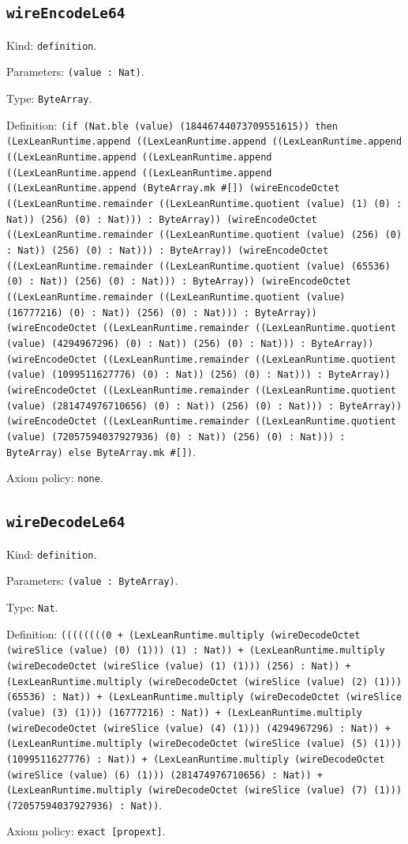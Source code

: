 \documentclass[11pt]{article}
\begin{document}
\subsection*{\texttt{wireEncodeLe64}}
\noindent Kind: \texttt{definition}.\par
\noindent Parameters: \texttt{(value : Nat)}.\par
\noindent Type: \texttt{ByteArray}.\par
\noindent Definition: \texttt{(if (Nat.ble (value) (18446744073709551615)) then (LexLeanRuntime.append ((LexLeanRuntime.append ((LexLeanRuntime.append ((LexLeanRuntime.append ((LexLeanRuntime.append ((LexLeanRuntime.append ((LexLeanRuntime.append ((LexLeanRuntime.append (ByteArray.mk \#[]) (wireEncodeOctet ((LexLeanRuntime.remainder ((LexLeanRuntime.quotient (value) (1) (0) : Nat)) (256) (0) : Nat))) : ByteArray)) (wireEncodeOctet ((LexLeanRuntime.remainder ((LexLeanRuntime.quotient (value) (256) (0) : Nat)) (256) (0) : Nat))) : ByteArray)) (wireEncodeOctet ((LexLeanRuntime.remainder ((LexLeanRuntime.quotient (value) (65536) (0) : Nat)) (256) (0) : Nat))) : ByteArray)) (wireEncodeOctet ((LexLeanRuntime.remainder ((LexLeanRuntime.quotient (value) (16777216) (0) : Nat)) (256) (0) : Nat))) : ByteArray)) (wireEncodeOctet ((LexLeanRuntime.remainder ((LexLeanRuntime.quotient (value) (4294967296) (0) : Nat)) (256) (0) : Nat))) : ByteArray)) (wireEncodeOctet ((LexLeanRuntime.remainder ((LexLeanRuntime.quotient (value) (1099511627776) (0) : Nat)) (256) (0) : Nat))) : ByteArray)) (wireEncodeOctet ((LexLeanRuntime.remainder ((LexLeanRuntime.quotient (value) (281474976710656) (0) : Nat)) (256) (0) : Nat))) : ByteArray)) (wireEncodeOctet ((LexLeanRuntime.remainder ((LexLeanRuntime.quotient (value) (72057594037927936) (0) : Nat)) (256) (0) : Nat))) : ByteArray) else ByteArray.mk \#[])}.\par
\noindent Axiom policy: \texttt{none}.\par
\subsection*{\texttt{wireDecodeLe64}}
\noindent Kind: \texttt{definition}.\par
\noindent Parameters: \texttt{(value : ByteArray)}.\par
\noindent Type: \texttt{Nat}.\par
\noindent Definition: \texttt{((((((((0 + (LexLeanRuntime.multiply (wireDecodeOctet (wireSlice (value) (0) (1))) (1) : Nat)) + (LexLeanRuntime.multiply (wireDecodeOctet (wireSlice (value) (1) (1))) (256) : Nat)) + (LexLeanRuntime.multiply (wireDecodeOctet (wireSlice (value) (2) (1))) (65536) : Nat)) + (LexLeanRuntime.multiply (wireDecodeOctet (wireSlice (value) (3) (1))) (16777216) : Nat)) + (LexLeanRuntime.multiply (wireDecodeOctet (wireSlice (value) (4) (1))) (4294967296) : Nat)) + (LexLeanRuntime.multiply (wireDecodeOctet (wireSlice (value) (5) (1))) (1099511627776) : Nat)) + (LexLeanRuntime.multiply (wireDecodeOctet (wireSlice (value) (6) (1))) (281474976710656) : Nat)) + (LexLeanRuntime.multiply (wireDecodeOctet (wireSlice (value) (7) (1))) (72057594037927936) : Nat))}.\par
\noindent Axiom policy: \texttt{exact [propext]}.\par
\end{document}

